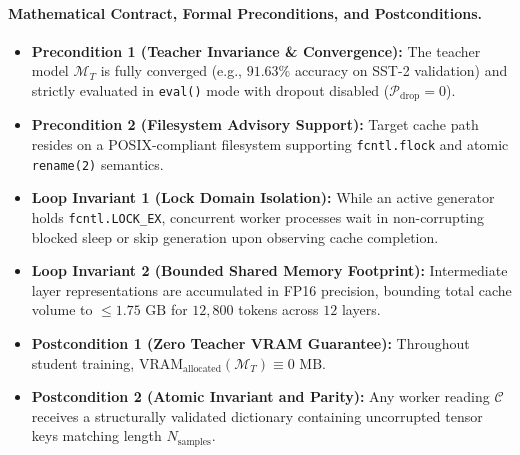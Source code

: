 \paragraph{Mathematical Contract, Formal Preconditions, and Postconditions.}
\begin{itemize}
    \item \textbf{Precondition 1 (Teacher Invariance \& Convergence):} The teacher model $\mathcal{M}_T$ is fully converged (e.g., $91.63\%$ accuracy on SST-2 validation) and strictly evaluated in \texttt{eval()} mode with dropout disabled ($\mathcal{P}_{\text{drop}} = 0$).
    \item \textbf{Precondition 2 (Filesystem Advisory Support):} Target cache path resides on a POSIX-compliant filesystem supporting \texttt{fcntl.flock} and atomic \texttt{rename(2)} semantics.
    \item \textbf{Loop Invariant 1 (Lock Domain Isolation):} While an active generator holds \texttt{fcntl.LOCK\_EX}, concurrent worker processes wait in non-corrupting blocked sleep or skip generation upon observing cache completion.
    \item \textbf{Loop Invariant 2 (Bounded Shared Memory Footprint):} Intermediate layer representations are accumulated in FP16 precision, bounding total cache volume to $\le 1.75\text{ GB}$ for $12{,}800$ tokens across $12$ layers.
    \item \textbf{Postcondition 1 (Zero Teacher VRAM Guarantee):} Throughout student training, $\text{VRAM}_{\text{allocated}}(\mathcal{M}_T) \equiv 0\text{ MB}$.
    \item \textbf{Postcondition 2 (Atomic Invariant and Parity):} Any worker reading $\mathcal{C}$ receives a structurally validated dictionary containing uncorrupted tensor keys matching length $N_{\text{samples}}$.
\end{itemize}

